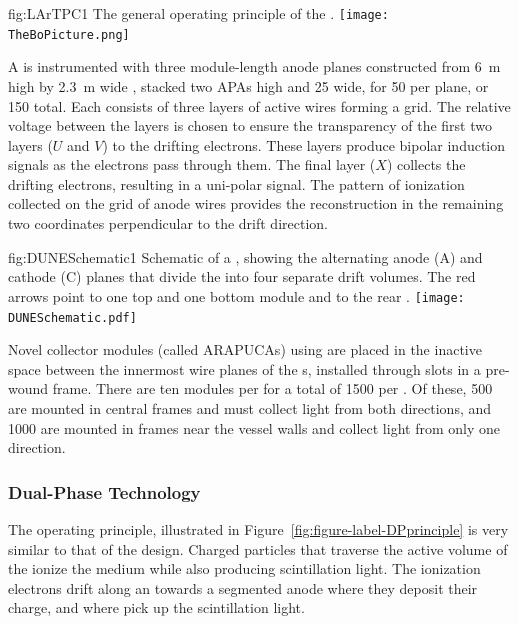 \begin{dunefigure}{fig:LArTPC1}
{The general operating principle of the  .}
\texttt{[image: TheBoPicture.png]} 
\end{dunefigure}

A  is instrumented with three module-length anode planes constructed from \SI{6}{m} high by \SI{2.3}{m} wide , stacked two APAs high and 25 wide, for 50  per plane, or 150 total. Each  consists of three layers of active wires forming a grid. The relative voltage between the layers is chosen to ensure the transparency of the first two layers ($U$ and $V$) to the drifting electrons. These layers produce bipolar induction signals as the electrons pass through them. The final layer ($X$) collects the drifting electrons, resulting in a uni-polar signal. The pattern of ionization collected on the grid of anode wires provides the reconstruction in the remaining two coordinates perpendicular to the drift direction.

\begin{dunefigure}{fig:DUNESchematic1}
{Schematic of a \nominalmodsize {}  , showing the alternating anode (A) and cathode (C) planes that divide the  into four separate drift volumes. The red arrows point to one top and one bottom  module and to the rear .}
\texttt{[image: DUNESchematic.pdf]}
\end{dunefigure}

Novel  collector modules (called ARAPUCAs) using  are placed in the inactive space between the innermost wire planes of the s, installed through slots in a pre-wound  frame. 
There are ten  modules per  for a total of \num{1500} per .  Of these, \num{500} are mounted in central  frames and must collect light from both directions, 
and \num{1000} are mounted in frames  near the vessel walls and collect light from only one direction. 

\FloatBarrier
\subsubsection{Dual-Phase Technology}
\label{sec:fddp-exec-splar}

The  operating principle, illustrated in Figure~\ref{fig:figure-label-DPprinciple} is very similar to that of the  design.  Charged particles that traverse the active volume of the  ionize the medium while also producing scintillation light.  The ionization electrons drift along an \efield towards a segmented anode where they deposit their charge, and where   pick up the scintillation light. 

